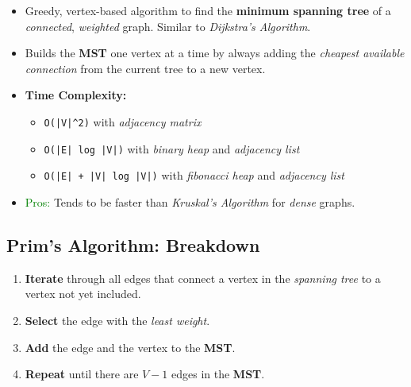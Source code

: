 \documentclass[12pt, letterpaper]{article}
\begin{document}
\begin{itemize}
    \item Greedy, vertex-based algorithm to find the \textbf{minimum spanning tree} of a \textit{connected}, \textit{weighted} graph. Similar to \textit{Dijkstra's Algorithm}.
    \item Builds the \textbf{MST} one vertex at a time by always adding the \textit{cheapest available connection} from the current tree to a new vertex.
    \item \textbf{Time Complexity:}
        \begin{itemize}
            \item \texttt{O(|V|\textasciicircum2)} with \textit{adjacency matrix}
            \item \texttt{O(|E| log |V|)} with \textit{binary heap} and \textit{adjacency list}
            \item \texttt{O(|E| + |V| log |V|)} with \textit{fibonacci heap} and \textit{adjacency list}
        \end{itemize}
    \item \textcolor{green}{Pros:} Tends to be faster than \textit{Kruskal's Algorithm} for \textit{dense} graphs.
\end{itemize}

\subsection*{Prim's Algorithm: Breakdown}

\begin{enumerate}
    \item \textbf{Iterate} through all edges that connect a vertex in the \textit{spanning tree} to a vertex not yet included.
    \item \textbf{Select} the edge with the \textit{least weight}.
    \item \textbf{Add} the edge and the vertex to the \textbf{MST}.
    \item \textbf{Repeat} until there are $ V - 1 $ edges in the \textbf{MST}.
\end{enumerate}
\end{document}
